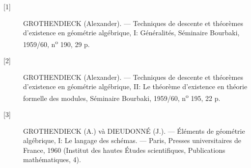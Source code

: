 \begin{description}
\item[{[1]}] GROTHENDIECK (Alexander). --- Techniques de descente et théorèmes
d'existence en géométrie algébrique, I: Généralités, Séminaire Bourbaki,
1959/60, n\textsuperscript{o} 190, 29 p.

\item[{[2]}] GROTHENDIECK (Alexander). --- Techniques de descente et théorèmes
d'existence en géométrie algébrique, II: Le théorème d'existence en théorie
formelle des modules, Séminaire Bourbaki, 1959/60,
n\textsuperscript{o} 195, 22 p.

\item[{[3]}] GROTHENDIECK (A.) và DIEUDONNÉ (J.). --- Éléments de géométrie
algébrique, I: Le langage des schémas. --- Paris, Presses universitaires de
France, 1960 (Institut des hautes Études scientifiques, Publications
mathématiques, 4).
\end{description}

\par
